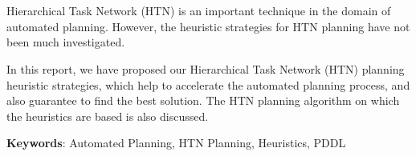 \section*{}

Hierarchical Task Network (HTN) is an important technique in the domain of automated planning. However, the heuristic strategies for HTN planning have not been much investigated.

In this report, we have proposed our Hierarchical Task Network (HTN) planning heuristic strategies, which help to accelerate the automated planning process, and also guarantee to find the best solution. The HTN planning algorithm on which the heuristics are based is also discussed.

\textbf{Keywords}: Automated Planning, HTN Planning, Heuristics, PDDL